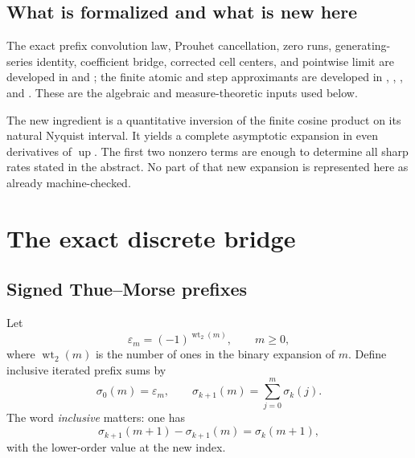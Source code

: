 \documentclass[11pt,oneside]{article}
\theoremstyle{definition}
\theoremstyle{remark}
\newcommand{\Up}{\operatorname{up}}
\newcommand{\wt}{\operatorname{wt}_2}
\begin{document}
\subsection{What is formalized and what is new here}

The exact prefix convolution law, Prouhet cancellation, zero runs, generating-series identity,
coefficient bridge, corrected cell centers, and pointwise limit are developed in
 and ; the finite atomic and step
approximants are developed in ,
, , and
 \cite{tmrates:proveit}.  These are the algebraic and
measure-theoretic inputs used below.

The new ingredient is a quantitative inversion of the finite cosine product on its natural
Nyquist interval.  It yields a complete asymptotic expansion in even derivatives of $\Up$.
The first two nonzero terms are enough to determine all sharp rates stated in the abstract.
No part of that new expansion is represented here as already machine-checked.

\section{The exact discrete bridge}
\label{tmrates:sec:bridge}

\subsection{Signed Thue--Morse prefixes}

Let
\begin{equation}
 \varepsilon_m=(-1)^{\wt(m)},\qquad m\ge0,                 \label{tmrates:eq:tm-sign}
\end{equation}
where $\wt(m)$ is the number of ones in the binary expansion of $m$.  Define inclusive
iterated prefix sums by
\begin{equation}
 \sigma_0(m)=\varepsilon_m,
 \qquad
 \sigma_{k+1}(m)=\sum_{j=0}^{m}\sigma_k(j).                \label{tmrates:eq:prefix-def}
\end{equation}
The word \emph{inclusive} matters: one has
\begin{equation}
 \sigma_{k+1}(m+1)-\sigma_{k+1}(m)=\sigma_k(m+1),          \label{tmrates:eq:forward-difference}
\end{equation}
with the lower-order value at the new index.
\end{document}
